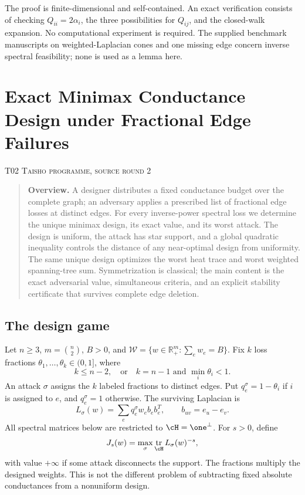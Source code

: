 \documentclass[11pt,a4paper]{article}
\theoremstyle{definition}\newtheorem{definition}[theorem]{Definition}
\theoremstyle{remark}\newtheorem{remark}[theorem]{Remark}
\newcommand{\R}{\mathbb R}\newcommand{\C}{\mathbb C}\newcommand{\N}{\mathbb N}
\DeclareMathOperator{\tr}{tr}\DeclareMathOperator{\supp}{supp}\DeclareMathOperator{\TV}{TV}
\numberwithin{equation}{section}
\begin{document}
The proof is finite-dimensional and self-contained. An exact verification consists of checking $Q_{ii}=2\alpha_i$, the three possibilities for $Q_{ij}$, and the closed-walk expansion. No computational experiment is required. The supplied benchmark manuscripts on weighted-Laplacian cones and one missing edge concern inverse spectral feasibility; none is used as a lemma here.




\clearpage
\section[T02 --- Exact Minimax Conductance Design under Fractional Edge Failures]{Exact Minimax Conductance Design under Fractional Edge Failures}\label{contrib-T02}
\noindent\textsc{T02 \quad Taisho programme, source round 2}\par\medskip



\begin{quote}\small\textbf{Overview.} A designer distributes a fixed conductance budget over the complete graph; an adversary applies a prescribed list of fractional edge losses at distinct edges. For every inverse-power spectral loss we determine the unique minimax design, its exact value, and its worst attack. The design is uniform, the attack has star support, and a global quadratic inequality controls the distance of any near-optimal design from uniformity. The same unique design optimizes the worst heat trace and worst weighted spanning-tree sum. Symmetrization is classical; the main content is the exact adversarial value, simultaneous criteria, and an explicit stability certificate that survives complete edge deletion.\end{quote}
\subsection{The design game}\label{T02-sec-1}
Let $n\ge3$, $m=\binom n2$, $B>0$, and $\mathcal W=\{w\in\R_+^m:\sum_e w_e=B\}$. Fix $k$ loss fractions $\theta_1,\ldots,\theta_k\in(0,1]$, where
\[
 k\le n-2,\quad\text{or}\quad k=n-1\text{ and }\min_i\theta_i<1.
\]
An attack $\sigma$ assigns the $k$ labeled fractions to distinct edges. Put $q_e^\sigma=1-\theta_i$ if $i$ is assigned to $e$, and $q_e^\sigma=1$ otherwise. The surviving Laplacian is
\[
 L_\sigma(w)=\sum_e q_e^\sigma w_e b_eb_e^T,\qquad b_{uv}=e_u-e_v.
\]
All spectral matrices below are restricted to $\cH=\one^\perp$. For $s>0$, define
\[
 J_s(w)=\max_\sigma\tr_{\cH}L_\sigma(w)^{-s},
\]
with value $+\infty$ if some attack disconnects the support. The fractions multiply the designed weights. This is not the different problem of subtracting fixed absolute conductances from a nonuniform design.
\end{document}
